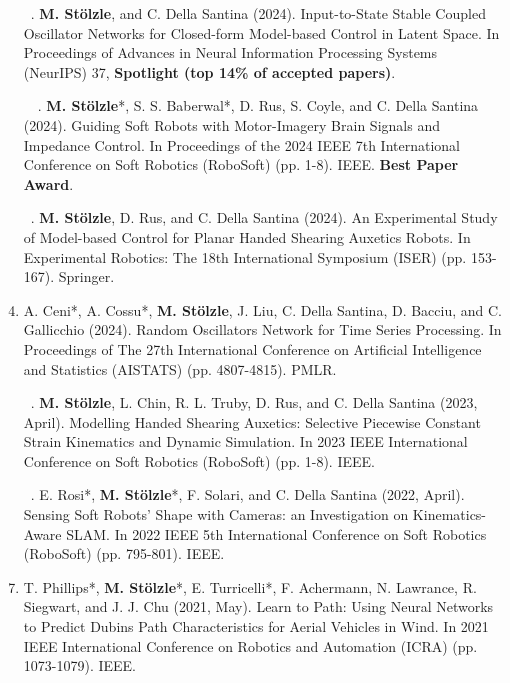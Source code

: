 \begin{enumerate}
    \item[\faFileTextO \, \stepcounter{enumi}\arabic{enumi}.] \textbf{M. Stölzle}, and C. Della Santina (2024). Input-to-State Stable Coupled Oscillator Networks for Closed-form Model-based Control in Latent Space. In Proceedings of Advances in Neural Information Processing Systems (NeurIPS) 37, \textbf{Spotlight (top 14\% of accepted papers)}.
    \item[\faFileTextO \, \faTrophy \, \stepcounter{enumi}\arabic{enumi}.] \textbf{M. Stölzle}*, S. S. Baberwal*, D. Rus, S. Coyle, and C. Della Santina (2024). Guiding Soft Robots with Motor-Imagery Brain Signals and Impedance Control. In Proceedings of the 2024 IEEE 7th International Conference on Soft Robotics (RoboSoft) (pp. 1-8). IEEE. \textbf{Best Paper Award}.
    \item[\faFileTextO \, \stepcounter{enumi}\arabic{enumi}.] \textbf{M. Stölzle}, D. Rus, and C. Della Santina (2024). An Experimental Study of Model-based Control for Planar Handed Shearing Auxetics Robots. In Experimental Robotics: The 18th International Symposium (ISER) (pp. 153-167). Springer.
    \item A. Ceni*, A. Cossu*, \textbf{M. Stölzle}, J. Liu, C. Della Santina, D. Bacciu, and C. Gallicchio (2024). Random Oscillators Network for Time Series Processing. In Proceedings of The 27th International Conference on Artificial Intelligence and Statistics (AISTATS) (pp. 4807-4815). PMLR.
    \item[\faFileTextO \, \stepcounter{enumi}\arabic{enumi}.] \textbf{M. Stölzle}, L. Chin, R. L. Truby, D. Rus, and C. Della Santina (2023, April). Modelling Handed Shearing Auxetics: Selective Piecewise Constant Strain Kinematics and Dynamic Simulation. In 2023 IEEE International Conference on Soft Robotics (RoboSoft) (pp. 1-8). IEEE.
    \item[\faFileTextO \, \stepcounter{enumi}\arabic{enumi}.] E. Rosi*, \textbf{M. Stölzle}*, F. Solari, and C. Della Santina (2022, April). Sensing Soft Robots' Shape with Cameras: an Investigation on Kinematics-Aware SLAM. In 2022 IEEE 5th International Conference on Soft Robotics (RoboSoft) (pp. 795-801). IEEE.
    \item T. Phillips*, \textbf{M. Stölzle}*, E. Turricelli*, F. Achermann, N. Lawrance, R. Siegwart, and J. J. Chu (2021, May). Learn to Path: Using Neural Networks to Predict Dubins Path Characteristics for Aerial Vehicles in Wind. In 2021 IEEE International Conference on Robotics and Automation (ICRA) (pp. 1073-1079). IEEE.
\end{enumerate}

